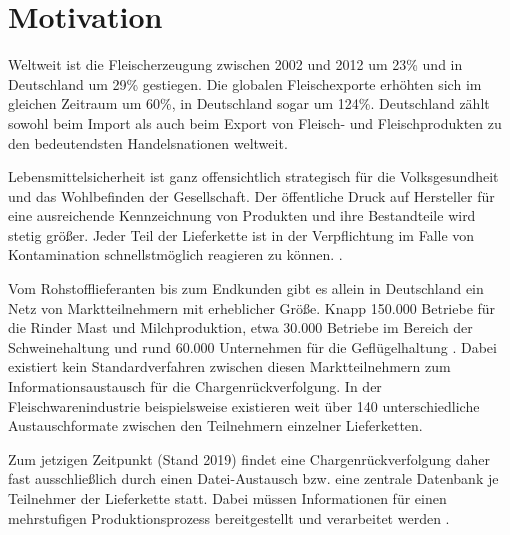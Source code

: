 \section{Motivation} \label{Motivation}

\begin{displayquote}
  \glqq Weltweit ist die Fleischerzeugung zwischen 2002 und 2012 um 23\% und in Deutschland um 29\% gestiegen. Die globalen Fleischexporte erhöhten sich im gleichen Zeitraum um 60\%, in Deutschland sogar um 124\%. Deutschland zählt sowohl beim Import als auch beim Export von Fleisch- und Fleischprodukten zu den bedeutendsten Handelsnationen weltweit.\grqq{}
\end{displayquote}

\begin{flushright}
  \citet{Efken2015}
\end{flushright}

Lebensmittelsicherheit ist ganz offensichtlich strategisch für die Volksgesundheit und das Wohlbefinden der Gesellschaft. Der öffentliche Druck auf Hersteller für eine ausreichende Kennzeichnung von Produkten und ihre Bestandteile wird stetig größer. Jeder Teil der Lieferkette ist in der Verpflichtung im Falle von Kontamination schnellstmöglich reagieren zu können. \citep{EPER2002}.

Vom Rohstofflieferanten bis zum Endkunden gibt es allein in Deutschland ein Netz von Marktteilnehmern mit erheblicher Größe. Knapp 150.000 Betriebe für die Rinder Mast und Milchproduktion, etwa 30.000 Betriebe im Bereich der Schweinehaltung und rund 60.000 Unternehmen für die Geflügelhaltung \citep{Efken2015}. Dabei existiert kein Standardverfahren zwischen diesen Marktteilnehmern zum Informationsaustausch für die Chargenrückverfolgung. In der Fleischwarenindustrie beispielsweise existieren weit über 140 unterschiedliche Austauschformate zwischen den Teilnehmern einzelner Lieferketten.

Zum jetzigen Zeitpunkt (Stand 2019) findet eine Chargenrückverfolgung daher fast ausschließlich durch einen Datei-Austausch bzw. eine zentrale Datenbank je Teilnehmer der Lieferkette statt. Dabei müssen Informationen für einen mehrstufigen Produktionsprozess bereitgestellt und verarbeitet werden \citep{Siepermann2015}.


